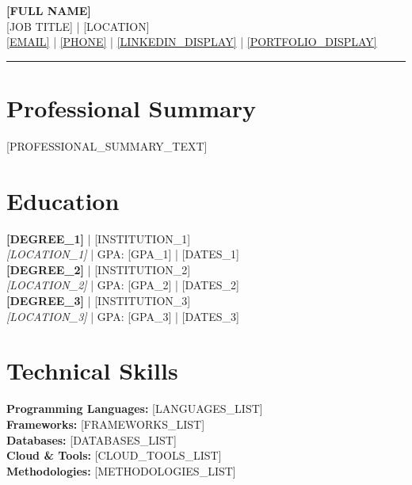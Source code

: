 \documentclass[11pt,a4paper]{article}
\begin{document}
\begin{center}
    {\Huge\bfseries [FULL NAME]}\\[0.3cm]
    {\large [JOB TITLE]} | {\large [LOCATION]}\\[0.2cm]
    {\normalsize \href{mailto:[EMAIL]}{[EMAIL]} | \href{[PHONE_URL]}{[PHONE]} | \href{[LINKEDIN_URL]}{[LINKEDIN_DISPLAY]} | \href{[PORTFOLIO_URL]}{[PORTFOLIO_DISPLAY]}}\\[0.3cm]
    \rule{\textwidth}{1pt}
\end{center}

\vspace{8pt}

\begin{multicols}{2}

\section{Professional Summary}
\vspace{4pt}
[PROFESSIONAL_SUMMARY_TEXT]

\section{Education}
\textbf{[DEGREE_1]} | [INSTITUTION_1]\\[0.2cm]
\textit{[LOCATION_1]} | GPA: [GPA_1] | [DATES_1]\\[0.3cm]

\textbf{[DEGREE_2]} | [INSTITUTION_2]\\[0.2cm]
\textit{[LOCATION_2]} | GPA: [GPA_2] | [DATES_2]\\[0.3cm]

\textbf{[DEGREE_3]} | [INSTITUTION_3]\\[0.2cm]
\textit{[LOCATION_3]} | GPA: [GPA_3] | [DATES_3]\\[0.3cm]

\section{Technical Skills}
\textbf{Programming Languages:} [LANGUAGES_LIST]\\[0.2cm]
\textbf{Frameworks:} [FRAMEWORKS_LIST]\\[0.2cm]
\textbf{Databases:} [DATABASES_LIST]\\[0.2cm]
\textbf{Cloud \& Tools:} [CLOUD_TOOLS_LIST]\\[0.2cm]
\textbf{Methodologies:} [METHODOLOGIES_LIST]\\[0.2cm]


\end{multicols}
\end{document}
